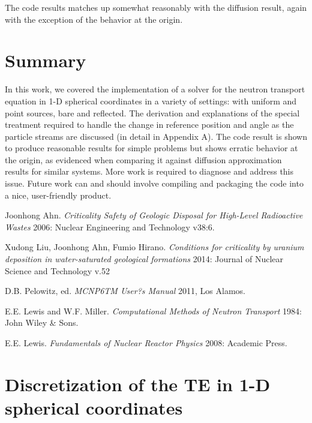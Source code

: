 \documentclass[11pt, oneside]{article}   	%
\begin{document}
The code results matches up somewhat reasonably with the diffusion result, again with the exception of the behavior at the origin.

\section{Summary}

In this work, we covered the implementation of a solver for the neutron transport equation in 1-D spherical coordinates in a variety of settings: with uniform and point sources, bare and reflected. The derivation and explanations of the special treatment required to handle the change in reference position and angle as the particle streams are discussed (in detail in Appendix A). The code result is shown to produce reasonable results for simple problems but shows erratic behavior at the origin, as evidenced when comparing it against diffusion approximation results for similar systems. More work is required to diagnose and address this issue. Future work can and should involve compiling and packaging the code into a nice, user-friendly product.

\begin{thebibliography}{1}

   Joonhong Ahn. {\em Criticality Safety of Geologic Disposal for High-Level Radioactive Wastes} 2006: Nuclear Engineering and Technology v38:6.

   Xudong Liu, Joonhong Ahn, Fumio Hirano. {\em Conditions for criticality by uranium deposition in water-saturated geological formations} 2014: Journal of Nuclear Science and Technology v.52
   
    D.B. Pelowitz, ed. {\em MCNP6TM User?s Manual} 2011, Los Alamos.
   
    E.E. Lewis and W.F. Miller. {\em Computational Methods of Neutron Transport} 1984: John Wiley \& Sons.
   
    E.E. Lewis. {\em Fundamentals of Nuclear Reactor Physics} 2008: Academic Press.
   
\end{thebibliography}

\appendix

\section{Discretization of the TE in 1-D spherical coordinates}
\end{document}
